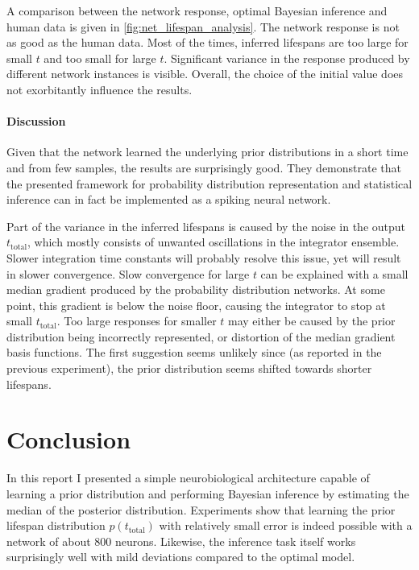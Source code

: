 \documentclass[a4paper,11pt]{article}
\begin{document}
A comparison between the network response, optimal Bayesian inference and human data is given in \cref{fig:net_lifespan_analysis}. The network response is not as good as the human data. Most of the times, inferred lifespans are too large for small $t$ and too small for large $t$. Significant variance in the response produced by different network instances is visible. Overall, the choice of the initial value does not exorbitantly influence the results.

\paragraph{Discussion}
Given that the network learned the underlying prior distributions in a short time and from few samples, the results are surprisingly good. They demonstrate that the presented framework for probability distribution representation and statistical inference can in fact be implemented as a spiking neural network.

Part of the variance in the inferred lifespans is caused by the noise in the output $t_\mathrm{total}$, which mostly consists of unwanted oscillations in the integrator ensemble. Slower integration time constants will probably resolve this issue, yet will result in slower convergence. Slow convergence for large $t$ can be explained with a small median gradient produced by the probability distribution networks. At some point, this gradient is below the noise floor, causing the integrator to stop at small $t_\mathrm{total}$. Too large responses for smaller $t$ may either be caused by the prior distribution being incorrectly represented, or distortion of the median gradient basis functions. The first suggestion seems unlikely since (as reported in the previous experiment), the prior distribution seems shifted towards shorter lifespans.

\pagebreak
\section{Conclusion}
\label{sec:conclusion}

In this report I presented a simple neurobiological architecture capable of learning a prior distribution and performing Bayesian inference by estimating the median of the posterior distribution. Experiments show that learning the prior lifespan distribution $p(t_\mathrm{total})$ with relatively small error is indeed possible with a network of about $800$ neurons. Likewise, the inference task itself works surprisingly well with mild deviations compared to the optimal model.
\end{document}
